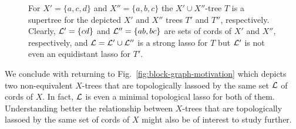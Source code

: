 \begin{figure}[h]
\begin{center}

\end{center}
\caption{\label{fig:supertree}
For $X'=\{a,c,d\}$ and $X''=\{a,b,c\}$ the $X'\cup X''$-tree $T$ is a supertree
for the depicted $X'$ and $X''$ trees $T'$ and $T''$, respectively. Clearly,
${\mathcal L}'=\{cd\}$ and ${\mathcal L}''=\{ab,bc\}$ are sets of cords of $X'$ and $X''$,
respectively, and ${\mathcal L}={\mathcal L}'\cup{\mathcal L}''$ is a strong lasso for $T$ but
${\mathcal L}'$ is not even an equidistant lasso for $T'$.
}
\end{figure}


We conclude with returning to Fig.~\ref{fig:block-graph-motivation}
which depicts two non-equivalent $X$-trees that are topologically
lassoed by the same set ${\mathcal L}$ of cords of $X$. In fact,
${\mathcal L}$ is even a minimal topological lasso for both of them. 
Understanding better the relationship between $X$-trees that are
topologically lassoed by the same set of cords of $X$ might also
be of interest to study further.

